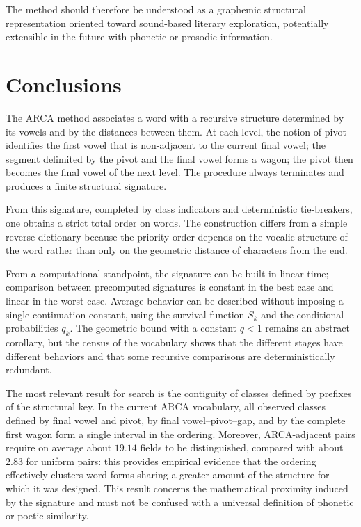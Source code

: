 \documentclass[11pt,a4paper]{article}
\theoremstyle{definition}
\theoremstyle{remark}
\begin{document}
The method should therefore be understood as a graphemic structural representation oriented toward sound-based literary exploration, potentially extensible in the future with phonetic or prosodic information.

\section{Conclusions}

The ARCA method associates a word with a recursive structure determined by its vowels and by the distances between them. At each level, the notion of pivot identifies the first vowel that is non-adjacent to the current final vowel; the segment delimited by the pivot and the final vowel forms a wagon; the pivot then becomes the final vowel of the next level. The procedure always terminates and produces a finite structural signature.

From this signature, completed by class indicators and deterministic tie-breakers, one obtains a strict total order on words. The construction differs from a simple reverse dictionary because the priority order depends on the vocalic structure of the word rather than only on the geometric distance of characters from the end.

From a computational standpoint, the signature can be built in linear time; comparison between precomputed signatures is constant in the best case and linear in the worst case. Average behavior can be described without imposing a single continuation constant, using the survival function $S_k$ and the conditional probabilities $q_k$. The geometric bound with a constant $q<1$ remains an abstract corollary, but the census of the vocabulary shows that the different stages have different behaviors and that some recursive comparisons are deterministically redundant.

The most relevant result for search is the contiguity of classes defined by prefixes of the structural key. In the current ARCA vocabulary, all observed classes defined by final vowel and pivot, by final vowel--pivot--gap, and by the complete first wagon form a single interval in the ordering. Moreover, ARCA-adjacent pairs require on average about $19.14$ fields to be distinguished, compared with about $2.83$ for uniform pairs: this provides empirical evidence that the ordering effectively clusters word forms sharing a greater amount of the structure for which it was designed. This result concerns the mathematical proximity induced by the signature and must not be confused with a universal definition of phonetic or poetic similarity.
\end{document}

